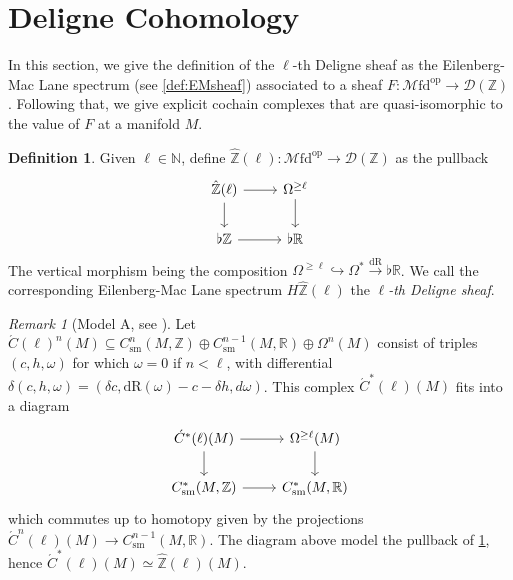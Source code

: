 \documentclass[10pt]{amsart}
\newcommand{\D}{\mathscr{D}}
\newcommand{\bN}{\mathbb{N}}
\newcommand{\bR}{\mathbb{R}}
\newcommand{\bZ}{\mathbb{Z}}
\newcommand{\Mfd}{\mathscr{M}\mathrm{fd}}
\newcommand{\dr}{\mathrm{dR}}
\newcommand{\op}{\mathrm{op}}
\newcommand{\sm}{\mathrm{sm}}
\theoremstyle{definition}
\newtheorem{definition}[equation]{Definition}
\theoremstyle{remark}
\newtheorem{remark}[equation]{Remark}
\numberwithin{equation}{section}
\begin{document}
\section{Deligne Cohomology}

In this section, we give the definition of the $\ell$-th Deligne sheaf as the Eilenberg-Mac Lane spectrum (see \cref{def:EMsheaf}) associated to a sheaf $F:\Mfd^{\op}\to\D(\bZ)$. Following that, we give explicit cochain complexes that are quasi-isomorphic to the value of $F$ at a manifold $M$.
\begin{definition}\label{def:deligne}
  Given $\ell\in\bN$, define $\hat{\bZ}(\ell):\Mfd^{\op}\to\D(\bZ)$ as the pullback 
  \[\begin{tikzcd}
    \hat{\bZ}(\ell)\arrow[r]\arrow[d] & \Omega^{\geq \ell}\arrow[d] \\
    \flat\bZ \arrow[r] & \flat\bR
  \end{tikzcd}\]
  The vertical morphism being the composition $\Omega^{\geq \ell}\hookrightarrow\Omega^*\xrightarrow{\dr}\flat\bR$. We call the corresponding Eilenberg-Mac Lane spectrum $H\hat{\bZ}(\ell)$ the $\ell$\emph{-th Deligne sheaf}.
\end{definition}
\begin{remark}[Model A, see {\cite[\S 3.2]{hopkinssinger2005diffcoh}}]\label{rmk:A} Let $\acute{C}(\ell)^n(M)\subseteq C_\sm^n(M,\bZ)\oplus C_\sm^{n-1}(M,\bR)\oplus\Omega^n(M)$ consist of triples $(c,h,\omega)$ for which $\omega=0$ if $n<\ell$, with differential $\delta(c,h,\omega)=(\delta c,\dr(\omega)-c-\delta h,d\omega)$. This complex $\acute{C}^*(\ell)(M)$ fits into a diagram
\[\begin{tikzcd}
    \acute{C}^*(\ell)(M) \arrow[d]\arrow[r] & \Omega^{\geq \ell}(M)\arrow[d] \\
    C_\sm^*(M,\bZ) \arrow[r] & C_\sm^*(M,\bR)
  \end{tikzcd}\]which commutes up to homotopy given by the projections $\acute{C}^n(\ell)(M)\to C_\sm^{n-1}(M,\bR)$. The diagram above model the pullback of \cref{def:deligne}, hence $\acute{C}^*(\ell)(M)\simeq\hat{\bZ}(\ell)(M)$. 
\end{remark}
\end{document}
